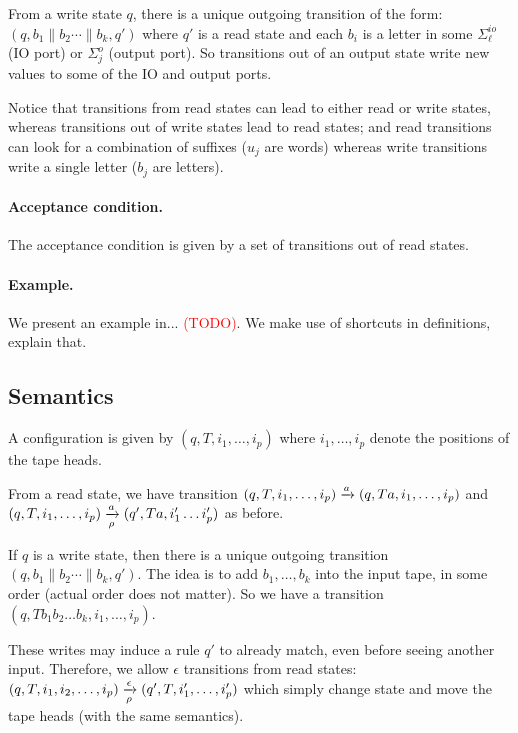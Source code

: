 From a write state $q$, there is a unique outgoing transition of the form: $(q, b_1 \parallel b_2 \cdots \parallel b_k, q')$ where $q'$ is a read state and each $b_i$ is a letter in some  $\Sigma^{io}_\ell$ (IO port) or $\Sigma^o_j$ (output port). So transitions out of an output state write new values to some of the IO and output ports.

Notice that transitions from read states can lead to either read or write states, whereas transitions out of write states lead to read states; and read transitions can look for a combination of suffixes ($u_j$ are words) whereas write transitions write a single letter ($b_j$ are letters).

\paragraph*{Acceptance condition.} The acceptance condition is given by a set of transitions out of read states.

\paragraph*{Example.} We present an example in... \textcolor{red}{(TODO)}. We make use of shortcuts in definitions, explain that.

\subsection{Semantics}

A configuration is given by $(q, T, i_1, \dots, i_p)$ where $i_1, \dots, i_p$ denote the positions of the tape heads. 

From a read state, we have transition $(q, T, i_1, \dots, i_p) \xrightarrow{a} (q, Ta, i_1, \dots, i_p)$ and $(q, T, i_1, \dots, i_p) \xrightarrow[\rho]{a} (q', Ta, i'_1 \dots i'_p)$ as before. 

If $q$ is a write state, then there is a unique outgoing transition $(q, b_1 \parallel b_2 \cdots \parallel b_k, q')$. The idea is to add $b_1, \dots, b_k$ into the input tape, in some order (actual order does not matter). So we have a transition $(q, Tb_1 b_2 \dots b_k, i_1, \dots, i_p)$.


These writes may induce a rule $q'$ to already match, even before seeing another input. Therefore, we allow $\epsilon$ transitions from read states: $(q, T, i_1, i_2, \dots, i_p) \xrightarrow[\rho]{\epsilon} (q', T, i'_1, \dots, i'_p)$ which simply change state and move the tape heads (with the same semantics). 